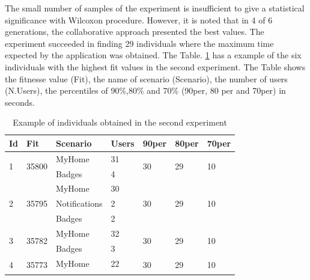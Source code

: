 The small number of samples of the experiment is insufficient to give a statistical significance with Wilcoxon procedure. However, it is noted that in 4 of 6 generations, the collaborative approach presented the best values. The experiment succeeded in finding 29 individuals where the maximum time expected by the application was obtained.  The Table. \ref{tab:secondexperiment1} has a example of the six individuals with the highest fit values in the second experiment. The Table shows the fitnesse value (Fit),  the name of scenario (Scenario), the number of users (N.Users), the percentiles of 90\%,80\% and 70\% (90per, 80 per and 70per) in seconds.  

\begin{table}[h]
\centering
\caption{Example of individuals obtained in the second experiment}
\label{tab:secondexperiment1}
\begin{tabular}{|p{0.2cm}|l|l|l|l|p{0.45cm}|p{0.45cm}|}
\hline
Id&Fit&Scenario&Users&90per&80per&70per\\ \hline
\multirow{2}{*}{1} & \multirow{2}{*}{35800} & MyHome        & 31              & \multirow{2}{*}{30} & \multirow{2}{*}{29} & \multirow{2}{*}{10} \\ \cline{3-4}
                   &                        & Badges        & 4               &                     &                     &                     \\ \hline
\multirow{3}{*}{2} & \multirow{3}{*}{35795} & MyHome        & 30              & \multirow{3}{*}{30} & \multirow{3}{*}{29} & \multirow{3}{*}{10} \\ \cline{3-4}
                   &                        & Notifications & 2               &                     &                     &                     \\ \cline{3-4}
                   &                        & Badges        & 2               &                     &                     &                     \\ \hline
\multirow{2}{*}{3} & \multirow{2}{*}{35782} & MyHome        & 32              & \multirow{2}{*}{30} & \multirow{2}{*}{29} & \multirow{2}{*}{10} \\ \cline{3-4}
                   &                        & Badges        & 3               &                     &                     &                     \\ \hline
\multirow{3}{*}{4} & \multirow{3}{*}{35773} & MyHome        & 22              & \multirow{3}{*}{30} & \multirow{3}{*}{29} & \multirow{3}{*}{10} \\ \cline{3-4}

\end{tabular}
\end{table}
